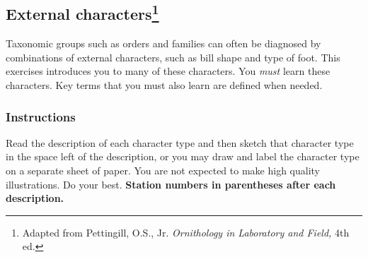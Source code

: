 \documentclass[10pt]{article}
\begin{document}
\thispagestyle{plain}

\subsection*{External characters\footnote{Adapted from Pettingill, O.S., Jr. \textit{Ornithology in Laboratory and Field,} 4th ed.}}

Taxonomic groups such as orders and families can often be diagnosed by combinations of external characters, such as bill shape and type of foot.  This exercises introduces you to many of these characters. You \emph{must} learn these characters. Key terms that you must also learn are defined when needed.

\subsubsection*{Instructions}

 Read the description of each character type and then sketch that character type in the space left of the description, or you may draw and label the character type on a separate sheet of paper. %
 You are not expected to make high quality illustrations. Do your best. \textbf{Station numbers in parentheses after each description.}
 
 
 
 

\end{document}
